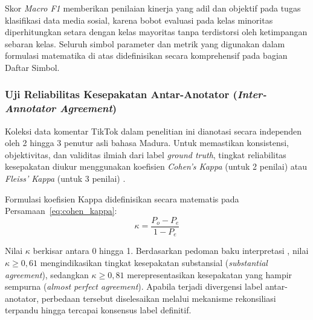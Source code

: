 Skor \textit{Macro F1} memberikan penilaian kinerja yang adil dan objektif pada tugas klasifikasi data media sosial, karena bobot evaluasi pada kelas minoritas diperhitungkan setara dengan kelas mayoritas tanpa terdistorsi oleh ketimpangan sebaran kelas. Seluruh simbol parameter dan metrik yang digunakan dalam formulasi matematika di atas didefinisikan secara komprehensif pada bagian Daftar Simbol.

\subsubsection{Uji Reliabilitas Kesepakatan Antar-Anotator (\textit{Inter-Annotator Agreement})}

Koleksi data komentar TikTok dalam penelitian ini dianotasi secara independen oleh 2 hingga 3 penutur asli bahasa Madura. Untuk memastikan konsistensi, objektivitas, dan validitas ilmiah dari label \textit{ground truth}, tingkat reliabilitas kesepakatan diukur menggunakan koefisien \textit{Cohen's Kappa} (untuk 2 penilai) atau \textit{Fleiss' Kappa} (untuk 3 penilai) \citep{cahyawijaya2023nusawrites, winata2023nusax}.

Formulasi koefisien Kappa didefinisikan secara matematis pada Persamaan~\eqref{eq:cohen_kappa}:
\begin{equation}
\label{eq:cohen_kappa}
\kappa = \frac{P_o - P_e}{1 - P_e}
\end{equation}

Nilai $\kappa$ berkisar antara 0 hingga 1. Berdasarkan pedoman baku interpretasi \citet{winata2023nusax}, nilai $\kappa \ge 0{,}61$ mengindikasikan tingkat kesepakatan substansial (\textit{substantial agreement}), sedangkan $\kappa \ge 0{,}81$ merepresentasikan kesepakatan yang hampir sempurna (\textit{almost perfect agreement}). Apabila terjadi divergensi label antar-anotator, perbedaan tersebut diselesaikan melalui mekanisme rekonsiliasi terpandu hingga tercapai konsensus label definitif.
